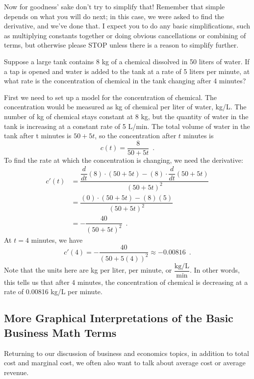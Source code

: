 Now for goodness' sake don't try to simplify that! Remember that simple depends on what you will do next; in this case, we were asked to find the derivative, and we've done that. I expect you to do any basic simplifications, such as multiplying constants together or doing obvious cancellations or combining of terms, but otherwise please STOP unless there is a reason to simplify further.

\begin{example}
Suppose a large tank contains 8 kg of a chemical dissolved in 50 liters of water. If a tap is opened and water is added to the tank at a rate of 5 liters per minute, at what rate is the concentration of chemical in the tank changing after 4 minutes?

\begin{solution} First we need to set up a model for the concentration of chemical. The concentration would be measured as kg of chemical per liter of water, kg/L. The number of kg of chemical stays constant at 8 kg, but the quantity of water in the tank is increasing at a constant rate of 5 L/min. The total volume of water in the tank after t minutes is $50+5t$, so the concentration after $t$ minutes is
$$c(t)=\dfrac{8}{50+5t} \enspace .$$
To find the rate at which the concentration is changing, we need the derivative:
\begin{align*}
			c'(t) &= \dfrac{\dfrac{d}{dt}(8)\cdot(50+5t)-(8)\cdot\dfrac{d}{dt}(50+5t)}{(50+5t)^2} \\
			 &= \dfrac{(0)\cdot(50+5t)-(8)(5)}{(50+5t)^2} \\
			 &= -\dfrac{40}{(50+5t)^2} \enspace .
		\end{align*}
At $t=4$ minutes, we have 
$$ c'(4)=-\dfrac{40}{(50+5(4))^2}\approx -0.00816 \enspace .$$
Note that the units here are kg per liter, per minute, or $ \dfrac{\text{kg/L}}{\text{min}} $. In other words, this tells us that after 4 minutes, the concentration of chemical is decreasing at a rate of 0.00816 kg/L per minute.
\end{solution}\end{example}

\subsection{More Graphical Interpretations of the Basic Business Math Terms}
Returning to our discussion of business and economics topics, in addition to total cost and marginal cost, we often also want to talk about average cost or average revenue.

